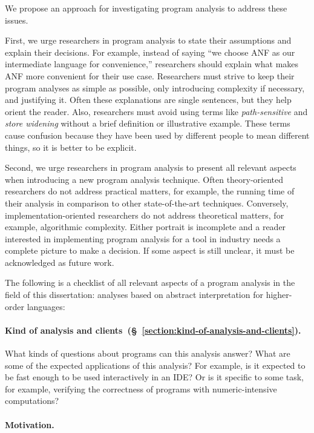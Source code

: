 \documentclass[12pt, oneside]{book}
\begin{document}
We propose an approach for investigating program analysis to address these issues.

First, we urge researchers in program analysis to state their assumptions and explain their decisions. For example, instead of saying “we choose ANF as our intermediate language for convenience,” researchers should explain what makes ANF more convenient for their use case. Researchers must strive to keep their program analyses as simple as possible, only introducing complexity if necessary, and justifying it. Often these explanations are single sentences, but they help orient the reader. Also, researchers must avoid using terms like \emph{path-sensitive} and \emph{store widening} without a brief definition or illustrative example. These terms cause confusion because they have been used by different people to mean different things, so it is better to be explicit.

Second, we urge researchers in program analysis to present all relevant aspects when introducing a new program analysis technique. Often theory-oriented researchers do not address practical matters, for example, the running time of their analysis in comparison to other state-of-the-art techniques. Conversely, implementation-oriented researchers do not address theoretical matters, for example, algorithmic complexity. Either portrait is incomplete and a reader interested in implementing program analysis for a tool in industry needs a complete picture to make a decision. If some aspect is still unclear, it must be acknowledged as future work.

The following is a checklist of all relevant aspects of a program analysis in the field of this dissertation: analyses based on abstract interpretation for higher-order languages:

\paragraph{Kind of analysis and clients~(§~\ref{section:kind-of-analysis-and-clients}).}

What kinds of questions about programs can this analysis answer? What are some of the expected applications of this analysis? For example, is it expected to be fast enough to be used interactively in an IDE? Or is it specific to some task, for example, verifying the correctness of programs with numeric-intensive computations?

\paragraph{Motivation.}
\end{document}

